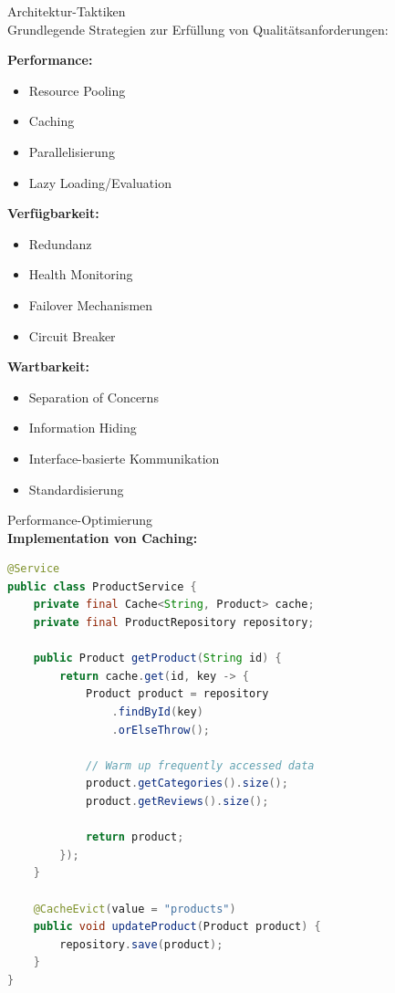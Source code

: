 \begin{concept}{Architektur-Taktiken}\\
Grundlegende Strategien zur Erfüllung von Qualitätsanforderungen:

\textbf{Performance:}
\begin{itemize}
    \item Resource Pooling
    \item Caching
    \item Parallelisierung
    \item Lazy Loading/Evaluation
\end{itemize}

\textbf{Verfügbarkeit:}
\begin{itemize}
    \item Redundanz
    \item Health Monitoring
    \item Failover Mechanismen
    \item Circuit Breaker
\end{itemize}

\textbf{Wartbarkeit:}
\begin{itemize}
    \item Separation of Concerns
    \item Information Hiding
    \item Interface-basierte Kommunikation
    \item Standardisierung
\end{itemize}
\end{concept}

\begin{example2}{Performance-Optimierung}\\
\textbf{Implementation von Caching:}

\begin{lstlisting}[language=Java, style=basesmol]
@Service
public class ProductService {
    private final Cache<String, Product> cache;
    private final ProductRepository repository;
    
    public Product getProduct(String id) {
        return cache.get(id, key -> {
            Product product = repository
                .findById(key)
                .orElseThrow();
                
            // Warm up frequently accessed data
            product.getCategories().size();
            product.getReviews().size();
            
            return product;
        });
    }
    
    @CacheEvict(value = "products")
    public void updateProduct(Product product) {
        repository.save(product);
    }
}
\end{lstlisting}
\end{example2}

